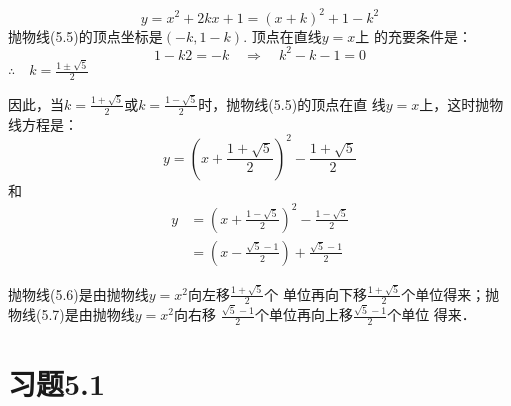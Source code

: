 \begin{solution}
\begin{equation}
    y=x^2+2kx+1=(x+k)^2+1-k^2
\end{equation}
抛物线(5.5)的顶点坐标是$(-k,1-k)$. 顶点在直线$y=x$上
的充要条件是：
\[1-k2=-k\quad \Rightarrow\quad k^2-k-1=0\]
$\therefore\quad k=\frac{1\pm\sqrt{5}}{2}$

因此，当$k=\frac{1+\sqrt{5}}{2}$或$k=\frac{1-\sqrt{5}}{2}$时，抛物线(5.5)的顶点在直
线$y=x$上，这时抛物线方程是：
\begin{equation}
y=\left(x+\frac{1+\sqrt{5}}{2}\right)^2-\frac{1+\sqrt{5}}{2}
\end{equation}
和
\begin{equation}
    \begin{split}
 y&=\left(x+\frac{1-\sqrt{5}}{2}\right)^2-\frac{1-\sqrt{5}}{2}\\
&=\left(x-\frac{\sqrt{5}-1}{2}\right)+\frac{\sqrt{5}-1}{2}
    \end{split}
\end{equation}  

抛物线(5.6)是由抛物线$y=x^2$向左移$\frac{1+\sqrt{5}}{2}$个
单位再向下移$\frac{1+\sqrt{5}}{2}$个单位得来；抛物线(5.7)是由抛物线$y=x^2$向右移
$\frac{\sqrt{5}-1}{2}$个单位再向上移$\frac{\sqrt{5}-1}{2}$个单位
得来．
\end{solution}

\section*{习题5.1}

